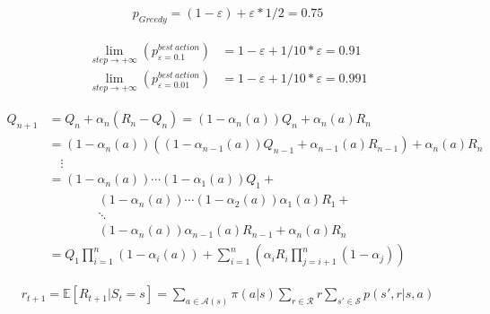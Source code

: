 \documentclass{article}
\begin{document}
\[
  \begin{aligned}
    p_{Greedy} = (1 - \varepsilon) + \varepsilon * 1/2 = 0.75
  \end{aligned}
\]

\[
  \begin{aligned}
    \lim\limits_{step\to+\infty} (p_{\varepsilon=0.1}^{best \ action}) &= 1 - \varepsilon + 1/10 * \varepsilon = 0.91 \\
    \lim\limits_{step\to+\infty} (p_{\varepsilon=0.01}^{best \ action}) &= 1 - \varepsilon + 1/10 * \varepsilon = 0.991
  \end{aligned}
\]

\[
  \begin{aligned}
    Q_{n+1} &= Q_{n} + \alpha_n (R_n - Q_n) = (1 - \alpha_n(a))Q_n + \alpha_n(a)R_n \\
            &= (1 - \alpha_n(a))((1 - \alpha_{n-1}(a))Q_{n-1} + \alpha_{n-1}(a)R_{n-1}) + \alpha_n(a)R_n\\
            & \quad \vdots\\
            &= (1 - \alpha_n(a))\cdots(1-\alpha_1(a))Q_1 + \\
            & \qquad \qquad (1 - \alpha_n(a))\cdots(1-\alpha_2(a))\alpha_1(a)R_1 + \\
            & \qquad \qquad \ddots\\
            & \qquad \qquad (1 - \alpha_n(a))\alpha_{n-1}(a)R_{n-1} + \alpha_n(a)R_n \\
            &= Q_1\prod^n_{i=1}(1 - \alpha_i(a)) + \sum^n_{i=1} (\alpha_iR_i \prod^n_{j=i+1}(1-\alpha_j))
  \end{aligned}
\]

\[
  \begin{aligned}
  r_{t+1} = \mathbb{E}[R_{t+1} | S_t = s] = \sum_{a\in \mathcal{A}(s)}\pi(a|s) \sum_{r\in\mathcal{R}} r \sum_{s'\in\mathcal{S}}p(s',r|s,a)\\
  \end{aligned}
\]
\end{document}
